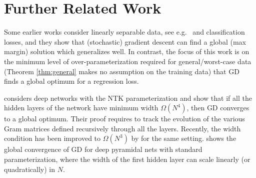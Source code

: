\documentclass{article}
\begin{document}

\section{Further Related Work} 
Some earlier works consider linearly separable data, see e.g.\ \cite{SoudryEtal2018, BrutzkusEtal2018} and classification losses,
and they show that (stochastic) gradient descent can find a global (max margin) solution which generalizes well.
In contrast, the focus of this work is on the minimum level of over-parameterization required for general/worst-case data
(Theorem \ref{thm:general} makes no assumption on the training data) that GD finds a global optimum for a regression loss.

\cite{DuEtal2019} considers deep networks with the NTK parameterization \cite{JacotEtc2018} and show that
if all the hidden layers of the network have minimum width $\Omega(N^4)$, then GD converges to a global optimum.
Their proof requires to track the evolution of the various Gram matrices defined recursively through all the layers.
Recently, the width condition has been improved to $\Omega(N^3)$ by \cite{HuangYau2020} for the same setting.
\cite{QuynhMarco2020} shows the global convergence of GD for deep pyramidal nets with standard parameterization, 
where the width of the first hidden layer can scale linearly (or quadratically) in $N$.
\end{document}
